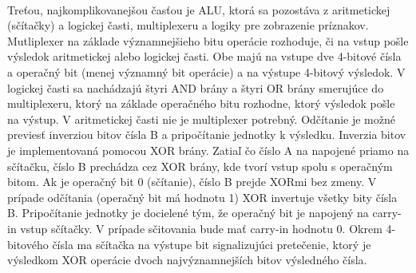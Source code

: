 \documentclass{article}
\begin{document}
    \paragraph{}
    Treťou, najkomplikovanejšou časťou je ALU, ktorá sa pozostáva z aritmetickej (sčítačky) a logickej časti, multiplexeru a logiky pre zobrazenie príznakov. Mutliplexer na základe významnejšieho bitu operácie rozhoduje, či na vstup pošle výsledok aritmetickej alebo logickej časti. Obe majú na vstupe dve 4-bitové čísla a operačný bit (menej významný bit operácie) a na výstupe 4-bitový výsledok. V logickej časti sa nachádzajú štyri AND brány a štyri OR brány smerujúce do multiplexeru, ktorý na základe operačného bitu rozhodne, ktorý výsledok pošle na výstup. V aritmetickej časti nie je multiplexer potrebný. Odčítanie je možné previesť inverziou bitov čísla B a pripočítanie jednotky k výsledku. Inverzia bitov je implementovaná pomocou XOR brány. Zatiaľ čo číslo A na napojené priamo na sčítačku, číslo B prechádza cez XOR brány, kde tvorí vstup spolu s operačným bitom. Ak je operačný bit 0 (sčítanie), číslo B prejde XORmi bez zmeny. V prípade odčítania (operačný bit má hodnotu 1) XOR invertuje všetky bity čísla B. Pripočítanie jednotky je docielené tým, že operačný bit je napojený na carry-in vstup sčítačky. V prípade sčitovania bude mať carry-in hodnotu 0. Okrem 4-bitového čísla ma sčítačka na výstupe bit signalizujúci pretečenie, ktorý je výsledkom XOR operácie dvoch najvýznamnejších bitov výsledného čísla.
\end{document}

